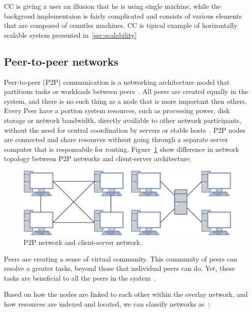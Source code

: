 CC is giving a user an illusion that he is using single machine, while the backgroud implementaion is fairly complicated and consists of various elements that are composed of countles machines. CC is tipical example of horizontally scalable system presented in~\ref{sec:scalability}
%
%
\subsection{Peer-to-peer networks}\label{sec:p2p_networks}
%
Peer-to-peer (P2P) communication is a networking architecture model that partitions tasks or workloads between peers~\cite{Schollmeier01}. All peers are created equally in the system, and there is no such thing as a node that is more important then others. Every Peer have a portion system resources, such as processing power, disk storage or network bandwidth, directly available to other network participants, without the need for central coordination by servers or stable hosts~\cite{Schollmeier01}. P2P nodes are connected and share resources without going through a separate server computer that is responsabile for routing. Figure~\ref{fig:fig2} show difference in network topology between P2P networks and client-server architecture.

\begin{figure}[H]
	\begin{center}
		\includegraphics[scale=0.7]{images/Figure2.png}
	\end{center}
	\vspace{-0.6cm}
	\caption{P2P network and client-server network.}
	\label{fig:fig2}
\end{figure}

Peers are creating a sense of virtual community. This community of peers can resolve a greater tasks, beyond those that individual peers can do. Yet, these tasks are beneficial to all the peers in the system~\cite{BandaraJ13}.

Based on how the nodes are linked to each other within the overlay network, and how resources are indexed and located, we can classify networks as~\cite{KamelSE07}:

